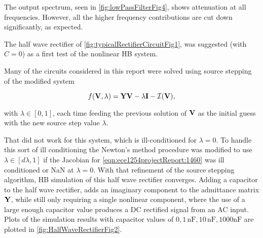The output spectrum, seen in \cref{fig:lowPassFilterFig4},
shows attenuation at all frequencies.
However, all the higher frequency contributions are cut down significantly, as expected.



The half wave rectifier of \cref{fig:typicalRectifierCircuitFig1}, was suggested (with \( C = 0 \)) as a first test of the nonlinear HB system.


Many of the circuits considered in this report were solved using source stepping of the modified system

\begin{equation}\label{eqn:ece1254projectReport:1460}
f(\BV, \lambda) = \BY \BV - \lambda \BI - \mathcal{I}(\BV),
\end{equation}

with \( \lambda \in [0, 1] \), each time feeding the previous solution of \( \mathbf{V} \) as the initial guess with the new source step value \( \lambda \).

That did not work for this system, which is ill-conditioned for \( \lambda = 0 \).
To handle this sort of ill conditioning the Newton's method procedure was modified to use \( \lambda \in [d\lambda, 1] \) if the Jacobian for \cref{eqn:ece1254projectReport:1460} was ill conditioned or NaN at \( \lambda = 0 \).
With that refinement of the source stepping algorithm, HB simulation of this half wave rectifier converges.
Adding a capacitor to the half wave rectifier, adds an imaginary component to the admittance matrix \( \mathbf{Y} \), while still only requiring a single nonlinear component, where the use of a large enough capacitor value produces a DC rectified signal from an AC input.
Plots of the simulation results with
capacitor values of \( 0, 1 \, \text{nF}, 10 \, \text{nF}, 1000 \text{nF} \) are plotted in \cref{fig:HalfWaveRectifierFig2}.


